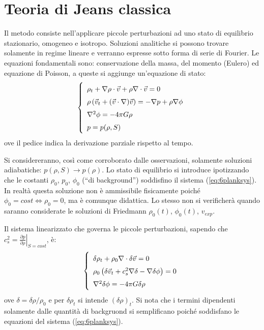 \section{Teoria di Jeans classica}
Il metodo consiste nell'applicare piccole perturbazioni ad uno stato di equilibrio stazionario, omogeneo e isotropo. Soluzioni analitiche si possono trovare solamente in regime lineare e verranno espresse sotto forma di serie di Fourier. Le equazioni fondamentali sono: conservazione della massa, del momento (Eulero) ed equazione di Poisson, a queste si aggiunge un'equazione di stato:
\begin{equation}\left\{
    \def\arraystretch{1.5}
        \begin{array}{l}
        \rho_t + \nabla \rho \cdot \vec{v} + \rho \nabla \cdot \vec{v} =0\\
        \rho \left (  \vec{v}_t + (\vec{v}\cdot \nabla )\vec{v}\right)=-\nabla p + \rho \nabla \phi \\
        \nabla^2 \phi = -4\pi G \rho \\
        p=p(\rho, S) 
    \end{array}\right. \label{eq:6planksys}
\end{equation}
ove il pedice indica la derivazione parziale rispetto al tempo. 

Si considereranno, così come corroborato dalle osservazioni, solamente soluzioni adiabatiche: $p(\rho, S)\rightarrow p(\rho)$. Lo stato di equilibrio si introduce ipotizzando che le costanti $\rho_0$, $p_0$, $\phi_0$ (``di background'') soddisfino il sistema (\ref{eq:6planksys}). In realtà questa soluzione non è ammissibile fisicamente poiché $\phi_0 = cost \Leftrightarrow \rho_0=0 $, ma è comunque didattica. Lo stesso non si verificherà quando saranno considerate le soluzioni di Friedmann $\rho_0(t)$, $\phi_0(t)$, $v_{exp}$.

Il sistema linearizzato che governa le piccole perturbazioni, sapendo che $c_s^2 = \left . \frac{\partial p}{\partial \rho} \right |_{S=cost}$, è:
\begin{equation}\left\{
    \def\arraystretch{1.5}
        \begin{array}{l}
        \delta\rho_t + \rho_0\nabla\cdot \delta \vec{v} =0 \\
        \rho_0 \left ( \delta \vec{v}_t + c_s^2 \nabla \delta - \nabla \delta\phi \right) = 0 \\
        \nabla^2 \delta \phi = -4\pi G \delta\rho
    \end{array}\right. 
\end{equation}
ove $\delta=\delta \rho / \rho_0$ e per $\delta \rho_t$ si intende $(\delta\rho)_t$. Si nota che i termini dipendenti solamente dalle quantità di backgruond si semplificano poiché soddisfano le equazioni del sistema (\ref{eq:6planksys}).


